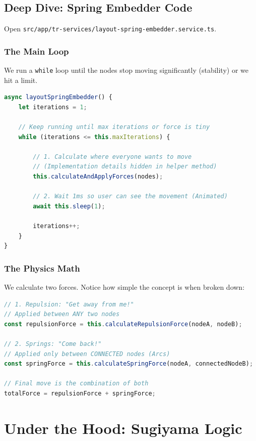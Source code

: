 \documentclass[a4paper,11pt,oneside]{report}
\begin{document}
\subsection{Deep Dive: Spring Embedder Code}

Open \texttt{src/app/tr-services/layout-spring-embedder.service.ts}.

\subsubsection{The Main Loop}

We run a \texttt{while} loop until the nodes stop moving significantly (stability) or we hit a limit.

\begin{lstlisting}[language=TypeScript]
async layoutSpringEmbedder() {
    let iterations = 1;
    
    // Keep running until max iterations or force is tiny
    while (iterations <= this.maxIterations) {
        
        // 1. Calculate where everyone wants to move
        // (Implementation details hidden in helper method)
        this.calculateAndApplyForces(nodes);

        // 2. Wait 1ms so user can see the movement (Animated)
        await this.sleep(1);
        
        iterations++;
    }
}
\end{lstlisting}

\subsubsection{The Physics Math}

We calculate two forces. Notice how simple the concept is when broken down:

\begin{lstlisting}[language=TypeScript]
// 1. Repulsion: "Get away from me!"
// Applied between ANY two nodes
const repulsionForce = this.calculateRepulsionForce(nodeA, nodeB);

// 2. Springs: "Come back!" 
// Applied only between CONNECTED nodes (Arcs)
const springForce = this.calculateSpringForce(nodeA, connectedNodeB);

// Final move is the combination of both
totalForce = repulsionForce + springForce;
\end{lstlisting}

\section{Under the Hood: Sugiyama Logic}
\end{document}
